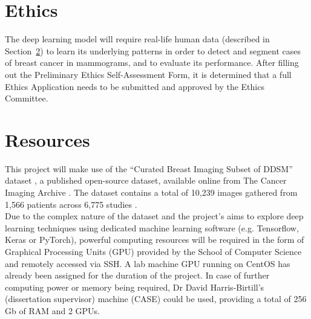 \documentclass[letterpaper,12pt]{article}
\begin{document}

\section{Ethics}
\label{sec:ethics}

The deep learning model will require real-life human data (described in Section~\ref{sec:resources}) to learn its underlying patterns in order to detect and segment cases of breast cancer in mammograms, and to evaluate its performance. After filling out the Preliminary Ethics Self-Assessment Form, it is determined that a full Ethics Application needs to be submitted and approved by the Ethics Committee.


\section{Resources}
\label{sec:resources}

This project will make use of the ``Curated Breast Imaging Subset of DDSM'' dataset \cite{Lee2017}, a published open-source dataset, available online from The Cancer Imaging Archive \cite{Clark2013}. The dataset contains a total of 10,239 images gathered from 1,566 patients across 6,775 studies \cite{Lee2017}.\\

Due to the complex nature of the dataset and the project's aims to explore deep learning techniques using dedicated machine learning software (e.g. Tensorflow, Keras or PyTorch), powerful computing resources will be required in the form of Graphical Processing Units (GPU) provided by the School of Computer Science and remotely accessed via SSH. A lab machine GPU running on CentOS has already been assigned for the duration of the project. In case of further computing power or memory being required, Dr David Harris-Birtill's (dissertation supervisor) machine (CASE) could be used, providing a total of 256 Gb of RAM and 2 GPUs.


\begin{appendices}

\clearpage



\end{appendices}
\end{document}

